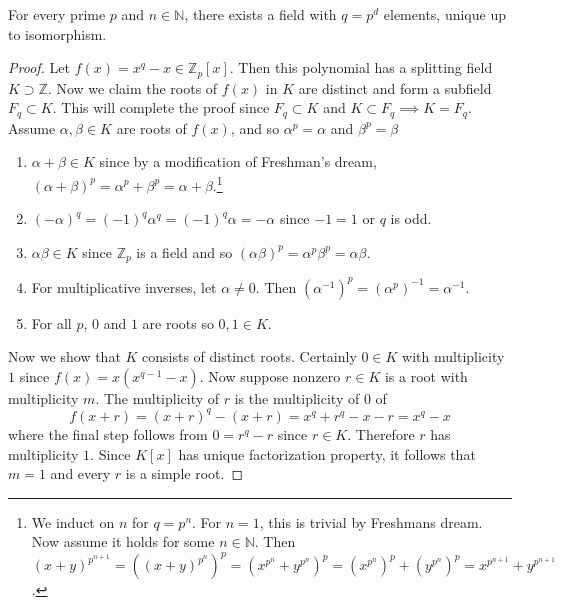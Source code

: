   \begin{theorem}
    For every prime $p$ and $n \in \mathbb{N}$, there exists a field with $q = p^d$ elements, unique up to isomorphism.  
  \end{theorem} 
  \begin{proof} 
    Let $f(x) = x^q - x \in \mathbb{Z}_p [x]$. Then this polynomial has a splitting field $K \supset \mathbb{Z}$. Now we claim the roots of $f(x)$ in $K$ are distinct and form a subfield $F_q \subset K$. This will complete the proof since $F_q \subset K$ and $K \subset F_q \implies K = F_q$. Assume $\alpha, \beta \in K$ are roots of $f(x)$, and so $\alpha^p = \alpha$ and $\beta^p = \beta$
    \begin{enumerate}
      \item $\alpha + \beta \in K$ since by a modification of Freshman's dream, $(\alpha + \beta)^p = \alpha^p + \beta^p = \alpha + \beta$.\footnote{We induct on $n$ for $q = p^n$. For $n=1$, this is trivial by Freshmans dream. Now assume it holds for some $n \in \mathbb{N}$. Then $(x + y)^{p^{n+1}} = ( (x + y)^{p^n} )^p = (x^{p^n} + y^{p^n})^p = (x^{p^n})^p + (y^{p^n})^p = x^{p^{n+1}} + y^{p^{n+1}}$. }
      \item $(-\alpha)^q = (-1)^q \alpha^q = (-1)^q \alpha = -\alpha$ since $-1 = 1$ or $q$ is odd. 
      \item $\alpha \beta \in K$ since $\mathbb{Z}_p$ is a field and so $(\alpha \beta)^p = \alpha^p \beta^p = \alpha \beta$. 
      \item For multiplicative inverses, let $\alpha \neq 0$. Then $(\alpha^{-1})^p = (\alpha^{p})^{-1} = \alpha^{-1}$. 
      \item For all $p$, $0$ and $1$ are roots so $0, 1 \in K$. 
    \end{enumerate}
    Now we show that $K$ consists of distinct roots. Certainly $0 \in K$ with multiplicity $1$ since $f(x) = x (x^{q-1} - x)$. Now suppose nonzero $r \in K$ is a root with multiplicity $m$. The multiplicity of $r$ is the multiplicity of $0$ of 
    \begin{equation}
      f(x + r) = (x + r)^q - (x + r) = x^q + r^q - x - r = x^q - x
    \end{equation}
    where the final step follows from $0 = r^q - r$ since $r \in K$. Therefore $r$ has multiplicity $1$. Since $K[x]$ has unique factorization property, it follows that $m=1$ and every $r$ is a simple root. 


\end{proof}
